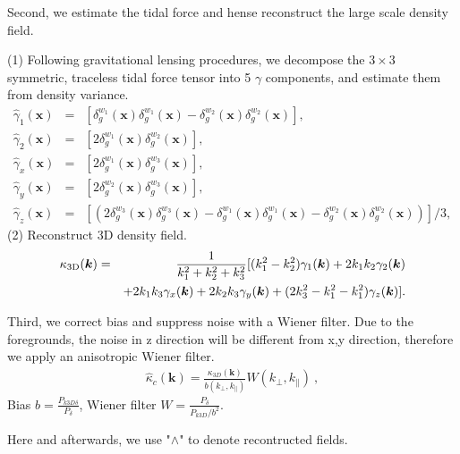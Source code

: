 Second, we estimate the tidal force and hense reconstruct the large scale density field.

(1) Following gravitational lensing procedures, we decompose the $3\times3$ symmetric, traceless tidal force tensor into 5 $\gamma$ components, and estimate them from density variance.
\begin{eqnarray}
\label{eq:gamma}
\hat{\gamma}_1(\bm{x})&=&
[{\delta}^{w_1}_g(\bm{x}){\delta}^{w_1}_g(\bm{x})-
{\delta}^{w_2}_g(\bm{x}){\delta}^{w_2}_g(\bm{x})],\nonumber\\
\hat{\gamma}_2(\bm{x})&=&
[2{\delta}^{w_1}_g(\bm{x}){\delta}^{w_2}_g(\bm{x})],\nonumber\\
\hat{\gamma}_x(\bm{x})&=&
[2{\delta}^{w_1}_g(\bm{x}){\delta}^{w_3}_g(\bm{x})],\\
\hat{\gamma}_y(\bm{x})&=&
[2{\delta}^{w_2}_g(\bm{x}){\delta}^{w_3}_g(\bm{x})],\nonumber\\
\hat{\gamma}_z(\bm{x})&=&
[(2{\delta}^{w_3}_g(\bm{x}){\delta}^{w_3}_g(\bm{x})-
{\delta}^{w_1}_g(\bm{x}){\delta}^{w_1}_g(\bm{x})-
{\delta}^{w_2}_g(\bm{x}){\delta}^{w_2}_g(\bm{x}))]/3,\nonumber
\end{eqnarray}
(2) Reconstruct 3D density field.
\begin{eqnarray}
\kappa_\mathrm{3D}(\bm{k})&=&\frac{1}{k_1^2+k_2^2+k_3^2}
[(k_1^2-k_2^2)\gamma_1(\bm{k})+2k_1k_2\gamma_2(\bm{k})\\
&&+2k_1k_3\gamma_x(\bm{k})+2k_2k_3\gamma_y(\bm{k})\nonumber
+(2k_3^2-k_1^2-k_1^2)\gamma_z(\bm{k})].
\end{eqnarray}

Third, we correct bias and suppress noise with a Wiener filter.
Due to the foregrounds, the noise in z direction will be different from x,y direction, therefore we apply an anisotropic Wiener filter.
\begin{eqnarray}
	\label{eq:wiener}
\hat \kappa_{c}(\bm{k})=\frac{\kappa_{3D}(\bm{k})}{b(k_\perp,k_\parallel)}W(k_\perp,k_\parallel)\ ,
\end{eqnarray}
Bias $b=\frac{P_{k3D \delta}}{P_\delta}$, Wiener filter $W=\frac{P_\delta}{P_{k3D}/b^2}$.

Here and afterwards, 
we use "$\wedge$" to denote recontructed fields.

